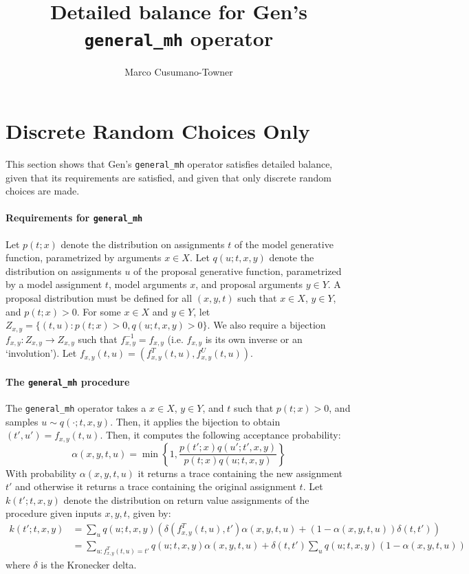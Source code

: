 \documentclass{article}
\title{Detailed balance for Gen's \texttt{general\_mh} operator}
\author{Marco Cusumano-Towner}
\begin{document}
\maketitle

\section{Discrete Random Choices Only}
This section shows that Gen's \texttt{general\_mh} operator satisfies detailed balance, given that its requirements are satisfied, and given that only discrete random choices are made.

\paragraph{Requirements for \texttt{general\_mh}}
Let $p(t; x)$ denote the distribution on assignments $t$ of the model generative function, parametrized by arguments $x \in X$.
Let $q(u; t, x, y)$ denote the distribution on assignments $u$ of the proposal generative function, parametrized by a model assignment $t$, model arguments $x$, and proposal arguments $y \in Y$.
A proposal distribution must be defined for all $(x, y, t)$ such that $x \in X$, $y \in Y$, and $p(t; x) > 0$.
For some $x \in X$ and $y \in Y$, let $Z_{x,y} = \{(t, u) : p(t; x) > 0, q(u; t, x, y) > 0\}$.
We also require a bijection $f_{x,y} : Z_{x,y} \to Z_{x,y}$ such that $f^{-1}_{x,y} = f_{x,y}$ (i.e. $f_{x,y}$ is its own inverse or an `involution').
Let $f_{x,y}(t, u) = (f^T_{x,y}(t, u), f^U_{x,y}(t, u))$.

\paragraph{The \texttt{general\_mh} procedure}
The \texttt{general\_mh} operator takes a $x \in X$, $y \in Y$, and $t$ such that $p(t; x) > 0$, and samples $u \sim q(\cdot; t, x, y)$.
Then, it applies the bijection to obtain $(t', u') = f_{x,y}(t, u)$.
Then, it computes the following acceptance probability:
\[
\alpha(x, y, t, u) = \min\left\{ 1, \frac{p(t'; x) q(u'; t', x, y)}{p(t; x) q(u; t, x, y)} \right\}
\]
With probability $\alpha(x, y, t, u)$ it returns a trace containing the new assignment $t'$ and otherwise it returns a trace containing the original assignment $t$.
Let $k(t'; t, x, y)$ denote the distribution on return value assignments of the procedure given inputs $x, y, t$, given by:
\begin{align}
    k(t'; t, x, y)
    &= \sum_{u} q(u; t, x, y) \left( \delta(f^T_{x,y}(t, u), t') \alpha(x, y, t, u) + (1 - \alpha(x, y, t, u)) \delta(t, t') \right)\\
    &= \sum_{u : f^T_{x,y}(t, u) = t'} q(u; t, x, y) \alpha(x, y, t, u) + \delta(t, t') \sum_u q(u; t, x, y) (1 - \alpha(x, y, t, u))
\end{align}
where $\delta$ is the Kronecker delta.
\end{document}
